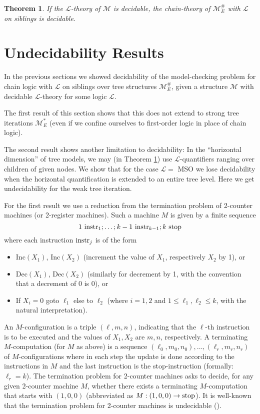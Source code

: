 \documentclass[copyright,creativecommons]{eptcs}
\newtheorem{theorem}{Theorem}
\theoremstyle{plain}
\theoremstyle{nonumberplain}
\newcommand{\m}{\ensuremath{\mathcal{M}}}
\newcommand{\el}{\ensuremath{\mathcal{L}}}
\newcommand{\MweakE}{\ensuremath{\m^{\#}_E}}
\newcommand{\MstrongE}{\ensuremath{\m^*_E}}
\begin{document}
\begin{theorem}\label{theo:weaktreeiterations}
If the $\el$-theory of $\m$ is decidable, the 
chain-theory of $\MweakE$ with $\el$ on siblings is decidable.
\end{theorem}



\section{Undecidability Results}\label{sec_equlev}



In the previous sections we showed decidability of the model-checking problem
for chain logic with $\el$ on siblings over tree structures $\MweakE$, given a 
structure $\m$ with decidable $\el$-theory for some logic $\el$. 

The first result of this section shows that this does not 
extend to strong tree iterations $\MstrongE$ (even if we confine ourselves 
to first-order logic in place of chain logic). 

The second result shows another limitation to decidability:
In the  ``horizontal dimension'' of tree models, we may (in Theorem \ref{theo:weaktreeiterations})
use 
 $\el$-quantifiers ranging over children of given nodes. We show 
  that for the case $\el =$ MSO we lose decidability when the horizontal quantification 
 is extended to an entire tree level. Here we get undecidability for the weak 
 tree iteration.
 
For the first result we use a reduction 
from the termination problem of 2-counter machines (or 2-register machines). 
Such a machine $M$ is given by a finite sequence 
$$ 1 \ {\rm instr}_1; \ldots; k-1 \ {\rm instr}_{k-1}; k \  {\rm stop}$$
where each instruction ${\rm instr}_j$ is of the form 
\begin{itemize}
\item 
Inc$(X_1)$, Inc$(X_2)$ 
(increment the value of $X_1$, respectively $X_2$ by 1),  or
\item 
Dec$(X_1)$, Dec$(X_2)$ (similarly for decrement by 1, with the 
convention that a decrement of 0 is 0), or 
\item 
If $X_i = 0$ goto $\ell_1$ else to $\ell_2$ (where $i = 1,2$ and $ 1 \leq 
\ell_1, \ell_2 \leq k$, with the natural
interpretation).
\end{itemize}
An $M$-configuration is a triple $(\ell, m,n)$, indicating 
that the $\ell$-th instruction is to be executed and the values 
of $X_1, X_2$ are $m,n$, respectively. A terminating 
$M$-computation (for $M$ as above) 
is a sequence $(\ell_0, m_0, n_0), \ldots, 
(\ell_r, m_r, n_r)$ of $M$-configurations where in each step the update is done
according to the instructions in $M$ and the last 
instruction is the stop-instruction (formally: $\ell_r = k$). 
The termination problem for 2-counter machines asks to 
decide, for any given 2-counter machine $M$, whether 
there exists a terminating $M$-computation that starts with 
$(1,0,0)$ (abbreviated as $M : (1,0,0) \rightarrow {\rm stop}$).
It is well-known that the termination problem for
2-counter machines is undecidable (\cite{min67}).
\end{document}
